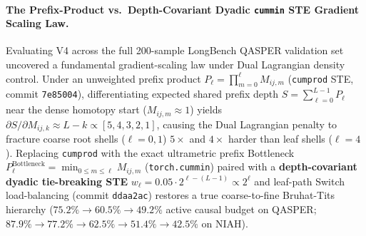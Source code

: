 \documentclass[11pt,a4paper]{article}
\begin{document}
\paragraph{The Prefix-Product vs.\ Depth-Covariant Dyadic \texttt{cummin} STE Gradient Scaling Law.}
Evaluating V4 across the full 200-sample LongBench QASPER validation set uncovered a fundamental gradient-scaling law under Dual Lagrangian density control. Under an unweighted prefix product $P_\ell = \prod_{m=0}^\ell M_{ij,m}$ (\texttt{cumprod} STE, commit \texttt{7e85004}), differentiating expected shared prefix depth $S = \sum_{\ell=0}^{L-1} P_\ell$ near the dense homotopy start ($M_{ij,m} \approx 1$) yields $\partial S / \partial M_{ij,k} \approx L - k \propto [5, 4, 3, 2, 1]$, causing the Dual Lagrangian penalty to fracture coarse root shells ($\ell=0,1$) $5\times$ and $4\times$ harder than leaf shells ($\ell=4$). Replacing \texttt{cumprod} with the exact ultrametric prefix Bottleneck $P_\ell^{\text{Bottleneck}} = \min_{0 \le m \le \ell} M_{ij,m}$ (\texttt{torch.cummin}) paired with a \textbf{depth-covariant dyadic tie-breaking STE} $w_\ell = 0.05 \cdot 2^{\ell - (L-1)} \propto 2^\ell$ and leaf-path Switch load-balancing (commit \texttt{ddaa2ac}) restores a true coarse-to-fine Bruhat-Tits hierarchy ($75.2\% \to 60.5\% \to 49.2\%$ active causal budget on QASPER; $87.9\% \to 77.2\% \to 62.5\% \to 51.4\% \to 42.5\%$ on NIAH).
\end{document}
